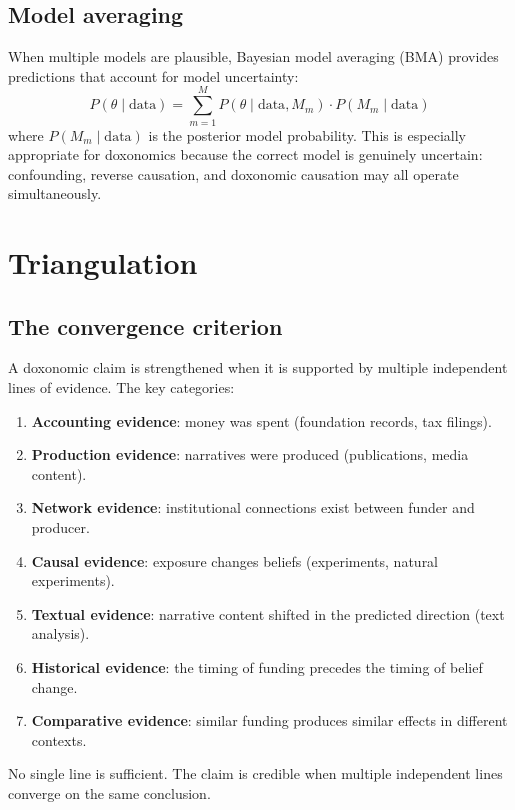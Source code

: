 \subsection{Model averaging}

When multiple models are plausible, Bayesian model averaging (BMA) provides predictions that account for model uncertainty:
\[
  P(\theta \mid \text{data}) = \sum_{m=1}^{M} P(\theta \mid \text{data}, M_m) \cdot P(M_m \mid \text{data})
\]
where $P(M_m \mid \text{data})$ is the posterior model probability.
This is especially appropriate for doxonomics because the correct model is genuinely uncertain: confounding, reverse causation, and doxonomic causation may all operate simultaneously.

\section{Triangulation}
\label{sec:ch20-triangulation}

\subsection{The convergence criterion}

\begin{principle}
\label{prin:triangulation}
A doxonomic claim is strengthened when it is supported by multiple independent lines of evidence.
The key categories:
\begin{enumerate}[nosep]
  \item \textbf{Accounting evidence}: money was spent (foundation records, tax filings).
  \item \textbf{Production evidence}: narratives were produced (publications, media content).
  \item \textbf{Network evidence}: institutional connections exist between funder and producer.
  \item \textbf{Causal evidence}: exposure changes beliefs (experiments, natural experiments).
  \item \textbf{Textual evidence}: narrative content shifted in the predicted direction (text analysis).
  \item \textbf{Historical evidence}: the timing of funding precedes the timing of belief change.
  \item \textbf{Comparative evidence}: similar funding produces similar effects in different contexts.
\end{enumerate}
No single line is sufficient.
The claim is credible when multiple independent lines converge on the same conclusion.
\end{principle}

